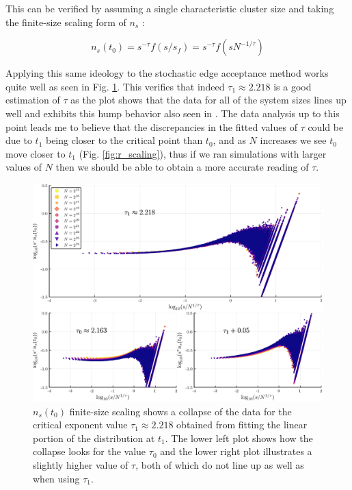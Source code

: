 This can be verified by assuming a single characteristic cluster size and taking the finite-size scaling form of $n_s$ \cite{Lee_1}:

\begin{equation}
	n_s(t_0) = s^{-\tau} f(s / s_f) = s^{-\tau} f(s N^{-1 / \tau})
\end{equation}

Applying this same ideology to the stochastic edge acceptance method works quite well as seen in Fig. \ref{fig:fss_collapse_triple}.
This verifies that indeed $\tau_1 \approx 2.218$ is a good estimation of $\tau$ as the plot shows that the data for all of the system sizes lines up well and exhibits this hump behavior also seen in \cite{Lee_1}.
The data analysis up to this point leads me to believe that the discrepancies in the fitted values of $\tau$ could be due to $t_1$ being closer to the critical point than $t_0$, and as $N$ increases we see $t_0$ move closer to $t_1$ (Fig. \ref{fig:r_scaling}), thus if we ran simulations with larger values of $N$ then we should be able to obtain a more accurate reading of $\tau$.

\begin{figure}[H]
	\centering
	\includegraphics[width=350pt, clip]{images/fss_collapse_triple.png}
	\caption{$n_s(t_0)$ finite-size scaling shows a collapse of the data for the critical exponent value $\tau_1 \approx 2.218$ obtained from fitting the linear portion of the distribution at $t_1$. The lower left plot shows how the collapse looks for the value $\tau_0$ and the lower right plot illustrates a slightly higher value of $\tau$, both of which do not line up as well as when using $\tau_1$.}
	\label{fig:fss_collapse_triple}
\end{figure}

